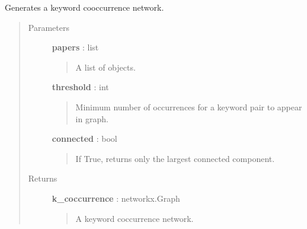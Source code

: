 \documentclass[letterpaper,10pt,english]{sphinxmanual}
\begin{document}
\begin{fulllineitems}
\label{tethne.networks:tethne.networks.terms.keyword_cooccurrence}
Generates a keyword cooccurrence network.
\begin{quote}\begin{description}
\item[{Parameters }] \leavevmode
\textbf{papers} : list
\begin{quote}

A list of {\hyperref[tethne:tethne.data.Paper]{}} objects.
\end{quote}

\textbf{threshold} : int
\begin{quote}

Minimum number of occurrences for a keyword pair to appear in graph.
\end{quote}

\textbf{connected} : bool
\begin{quote}

If True, returns only the largest connected component.
\end{quote}

\item[{Returns }] \leavevmode
\textbf{k\_coccurrence} :  networkx.Graph
\begin{quote}

A keyword coccurrence network.
\end{quote}

\end{description}\end{quote}

\end{fulllineitems}

\end{document}
